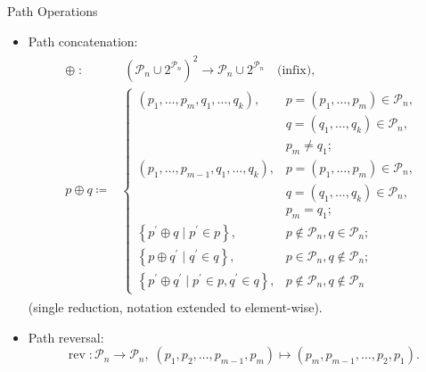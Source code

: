 \documentclass[
  size=8pt,
  style=klope,
  paper=screen,
  mode=present,
  nohandoutpagebreaks,
  pauseslide,
  hlsections,
  fleqn,
]{powerdot}
\def\board{{\color{green} [Optional: board.]}}
\begin{document}
\begin{slide}[toc=]{Path Operations}
\begin{itemize}
  \item
  Path concatenation:
  \begin{align}
    \begin{split}
    \oplus \; : & \; {\left( \mathcal{P}_n \cup 2^{\mathcal{P}_n} \right)}^2 \to \mathcal{P}_n \cup 2^{\mathcal{P}_n} \quad \text{(infix)},
    \\
    p \oplus q \coloneqq &
    \begin{cases}
      \left(p_1,\ldots,p_m,q_1,\ldots,q_k\right),
      & p = \left(p_1,\ldots,p_m\right) \in \mathcal{P}_n, \\
      & q = \left(q_1,\ldots,q_k\right) \in \mathcal{P}_n, \\
      & p_m \neq q_1;
      \\
      \left(p_1,\ldots,p_{m-1},q_1,\ldots,q_k\right),
      & p = \left(p_1,\ldots,p_m\right) \in \mathcal{P}_n, \\
      & q = \left(q_1,\ldots,q_k\right) \in \mathcal{P}_n, \\
      & p_m = q_1;
      \\
      \left\{p^\prime \oplus q \; \vert \; p^\prime \in p\right\},
      & p \notin \mathcal{P}_n, q \in \mathcal{P}_n;
      \\
      \left\{p \oplus q^\prime \; \vert \; q^\prime \in q\right\},
      & p \in \mathcal{P}_n, q \notin \mathcal{P}_n;
      \\
      \left\{p^\prime \oplus q^\prime \; \vert \; p^\prime \in p, q^\prime \in q\right\},
      & p \notin \mathcal{P}_n, q \notin \mathcal{P}_n
    \end{cases}
    \end{split}
  \end{align}
  (single reduction, notation extended to element-wise).
  \item Path reversal:
    \begin{equation}
      \operatorname{rev} : \mathcal{P}_n \to \mathcal{P}_n, \;
      \left(p_1,p_2,\ldots,p_{m-1},p_m\right) \mapsto \left(p_m,p_{m-1},\ldots,p_2,p_1\right).
    \end{equation}
\end{itemize}
\end{slide}
\end{document}
